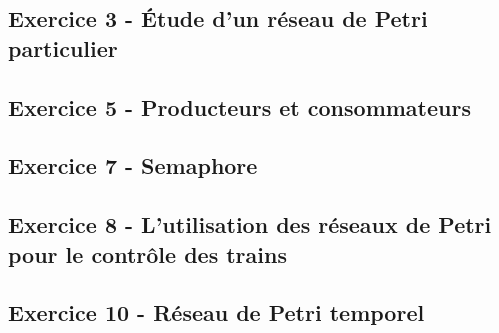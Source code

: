\documentclass[a4paper,11pt]{article}
\begin{document}
\subsection{Exercice 3 - Étude d'un réseau de Petri particulier}





\subsection{Exercice 5 - Producteurs et consommateurs}





\subsection{Exercice 7 - Semaphore}



\subsection{Exercice 8 - L'utilisation des réseaux de Petri pour le contrôle des trains}



\subsection{Exercice 10 - Réseau de Petri temporel}


\end{document}
